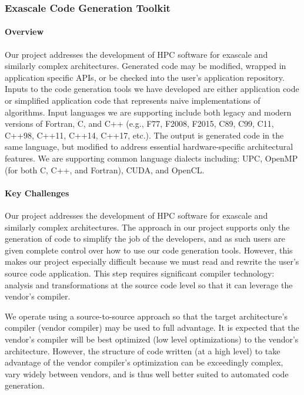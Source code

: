 
\subsubsection{Exascale Code Generation Toolkit} 


\paragraph{Overview} 

Our project addresses the development of HPC software for exascale and similarly complex architectures. 
Generated code 
may be modified, wrapped in application specific APIs, or be checked into the user’s application 
repository. Inputs to the code generation tools we have developed are either application 
code or simplified application code that represents naive implementations of algorithms. Input languages 
we are supporting include both legacy and modern versions of Fortran, C, and C++ 
(e.g., F77, F2008, F2015, C89, C99, C11, C++98, C++11, C++14, C++17, etc.). The output is generated 
code in the same language, but modified to address essential hardware-specific architectural features. 
We are supporting common language dialects including: UPC, OpenMP 
(for both C, C++, and Fortran), CUDA, and OpenCL.

\paragraph{Key  Challenges}

   Our project addresses the development of HPC software for exascale and
similarly complex architectures.
The approach in our project supports only the generation of code to simplify 
the job of the developers, and as such 
users are given complete control over how to use our code generation tools.
However, this makes our project especially difficult because we must read and rewrite 
the user's source code application.  This step requires significant compiler technology: 
analysis and transformations at the source code level so that it can leverage the vendor's compiler.

We operate using a source-to-source approach so that the target architecture's compiler 
(vendor compiler) may be used to full advantage. It is expected that the vendor's compiler 
will be best optimized (low level optimizations) to the vendor's architecture. However, 
the structure of code written (at a high level) to take advantage of the vendor compiler's 
optimization can be exceedingly complex, vary widely between vendors, and is thus well 
better suited to automated code generation.

